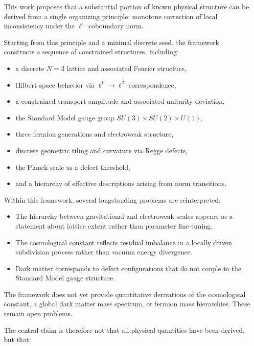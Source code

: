 \documentclass[
]{article}
\providecommand{\tightlist}{%
  \setlength{\itemsep}{0pt}\setlength{\parskip}{0pt}}
\begin{document}
This work proposes that a substantial portion of known physical
structure can be derived from a single organizing principle: monotone
correction of local inconsistency under the \(\ell^1\) coboundary norm.

Starting from this principle and a minimal discrete seed, the framework
constructs a sequence of constrained structures, including:

\begin{itemize}
\tightlist
\item
  a discrete \(N = 3\) lattice and associated Fourier structure,
\item
  Hilbert space behavior via \(\ell^1 \to \ell^2\) correspondence,
\item
  a constrained transport amplitude and associated unitarity deviation,
\item
  the Standard Model gauge group \(SU(3) \times SU(2) \times U(1)\),
\item
  three fermion generations and electroweak structure,
\item
  discrete geometric tiling and curvature via Regge defects,
\item
  the Planck scale as a defect threshold,
\item
  and a hierarchy of effective descriptions arising from norm
  transitions.
\end{itemize}

Within this framework, several longstanding problems are reinterpreted:

\begin{itemize}
\tightlist
\item
  The hierarchy between gravitational and electroweak scales appears as
  a statement about lattice extent rather than parameter fine-tuning.
\item
  The cosmological constant reflects residual imbalance in a locally
  driven subdivision process rather than vacuum energy divergence.
\item
  Dark matter corresponds to defect configurations that do not couple to
  the Standard Model gauge structure.
\end{itemize}

The framework does not yet provide quantitative derivations of the
cosmological constant, a global dark matter mass spectrum, or fermion
mass hierarchies. These remain open problems.

The central claim is therefore not that all physical quantities have
been derived, but that:
\end{document}
